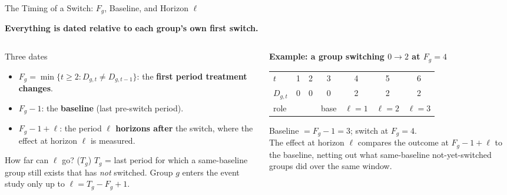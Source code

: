 \documentclass[main.tex]{subfiles}
\begin{document}
\begin{frame}{The Timing of a Switch: $F_g$, Baseline, and Horizon $\ell$}

  \textbf{Everything is dated relative to each group's own first switch.}

  \medskip
  \begin{columns}[T]
    \begin{column}{0.48\textwidth}
      \begin{block}{Three dates}
        \footnotesize
        \begin{itemize}\footnotesize
          \item $F_g = \min\{t\geq 2 : D_{g,t}\neq D_{g,t-1}\}$:
            the \textbf{first period treatment changes}.
          \item $F_g-1$: the \textbf{baseline} (last pre-switch period).
          \item $F_g-1+\ell$: the period \textbf{$\ell$ horizons after}
            the switch, where the effect at horizon $\ell$ is measured.
        \end{itemize}
      \end{block}
      \smallskip
      \begin{block}{\footnotesize How far can $\ell$ go? ($T_g$)}
        \footnotesize
        $T_g$ = last period for which a same-baseline group still
        exists that has \emph{not} switched. Group $g$ enters the event
        study only up to $\ell = T_g - F_g + 1$.
      \end{block}
    \end{column}
    \begin{column}{0.48\textwidth}
      \textbf{Example: a group switching $0\to 2$ at $F_g=4$}

      \smallskip
      \footnotesize
      \begin{tabular}{@{}lcccccc@{}}
        \toprule
        $t$ & 1 & 2 & 3 & 4 & 5 & 6 \\
        $D_{g,t}$ & 0 & 0 & 0 & 2 & 2 & 2 \\
        \midrule
        role & & & base & $\ell{=}1$ & $\ell{=}2$ & $\ell{=}3$ \\
        \bottomrule
      \end{tabular}

      \smallskip
      Baseline $=F_g-1=3$; switch at $F_g=4$.\\[3pt]
      The effect at horizon $\ell$ compares the outcome at $F_g-1+\ell$ to the
      baseline, netting out what same-baseline not-yet-switched
      groups did over the same window.
    \end{column}
  \end{columns}

\end{frame}
\end{document}
